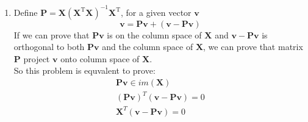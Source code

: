 \documentclass[a4paper]{article}
\begin{document}
\begin{enumerate}
  \setlength{\itemsep}{3\parskip}
\item Define $\boldsymbol{P} = \boldsymbol{X}\left(\boldsymbol{X}^{\mathrm{T}} \boldsymbol{X}\right)^{-1} \boldsymbol{X}^{\mathrm{T}}$, for a given vector $\boldsymbol{v}$
\begin{equation*}
  \boldsymbol{v} = \boldsymbol{P} \boldsymbol{v}+ (\boldsymbol{v}-\boldsymbol{P} \boldsymbol{v})
\end{equation*}
If we can prove that $\boldsymbol{P} \boldsymbol{v}$ is on the column space of $\boldsymbol{X}$ and $\boldsymbol{v}-\boldsymbol{P} \boldsymbol{v}$ is orthogonal to both $\boldsymbol{P} \boldsymbol{v}$ and the column space of $\boldsymbol{X}$,
we can prove that matrix $\boldsymbol{P}$ project $\boldsymbol{v}$ onto column space of $\boldsymbol{X}$.\\
So this problem is equvalent to prove:
  \begin{equation*}
    \begin{gathered}
      \boldsymbol{P} \boldsymbol{v} \in im(\boldsymbol{X})\\
      (\boldsymbol{P} \boldsymbol{v})^T (\boldsymbol{v}-\boldsymbol{P} \boldsymbol{v}) = 0\\
      \boldsymbol{X}^T (\boldsymbol{v}-\boldsymbol{P} \boldsymbol{v}) = 0\\
    \end{gathered}
    \label{eq:svm:p}
  \end{equation*}


\end{enumerate}
\end{document}
